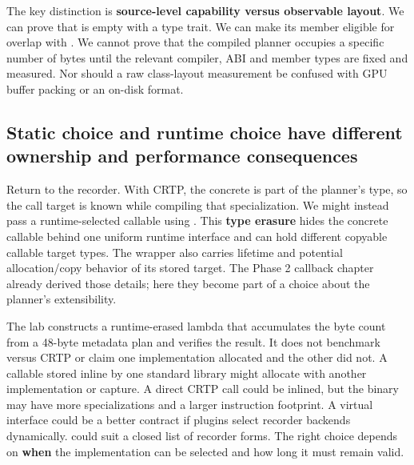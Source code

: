 The key distinction is \textbf{source-level capability versus observable layout}. We can prove that  is empty with a type trait. We can make its member eligible for overlap with . We cannot prove that the compiled planner occupies a specific number of bytes until the relevant compiler, ABI and member types are fixed and measured. Nor should a raw class-layout measurement be confused with GPU buffer packing or an on-disk format.

\subsection{Static choice and runtime choice have different ownership and performance consequences}\label{01-foundations-i-ch005-static-choice-and-runtime-choice-have-different-ownership-and-performance-consequences}

\hypertarget{01-foundations-i-ch005-static-choice-and-runtime-choice-have-different-ownership-and-performance-consequences}{}

Return to the recorder. With CRTP, the concrete  is part of the planner's type, so the call target is known while compiling that specialization. We might instead pass a runtime-selected callable using . This \textbf{type erasure} hides the concrete callable behind one uniform runtime interface and can hold different copyable callable target types. The wrapper also carries lifetime and potential allocation/copy behavior of its stored target. The Phase 2 callback chapter already derived those details; here they become part of a choice about the planner's extensibility.

The lab constructs a runtime-erased lambda that accumulates the byte count from a 48-byte metadata plan and verifies the result. It does not benchmark  versus CRTP or claim one implementation allocated and the other did not. A callable stored inline by one standard library might allocate with another implementation or capture. A direct CRTP call could be inlined, but the binary may have more specializations and a larger instruction footprint. A virtual interface could be a better contract if plugins select recorder backends dynamically.  could suit a closed list of recorder forms. The right choice depends on \textbf{when} the implementation can be selected and how long it must remain valid.

